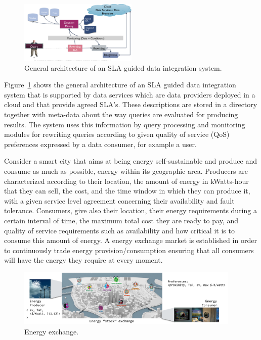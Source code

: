 \begin{figure}
\includegraphics[width=0.5\textwidth]{figs/arch.png}
\caption{General architecture of an SLA guided  data integration system.\label{fig:arch}}
\end{figure}

Figure~\ref{fig:arch} shows the general architecture of an SLA guided data integration system that is supported by data services which are data providers deployed in a cloud and that provide agreed SLA’s. 
These descriptions are stored in a directory together with meta-data about the way queries are evaluated for producing results. 
The system uses this information  by query processing and monitoring modules for rewriting queries according to given quality of service (QoS) preferences expressed by a data consumer, for example a user.


Consider a smart city that aims at being energy self-sustainable and produce and consume as much as possible, energy within its geographic area. 
Producers are characterized according to their location, the amount of energy in kWatts-hour that they can sell, the cost, and the time window in which they can produce it, with a given service level agreement concerning their availability and fault tolerance. 
Consumers, give also their location, their energy requirements during a certain interval of time, the maximum total cost they are ready to pay, and quality of service requirements such as availability and how critical it is to consume this amount of energy. 
A energy exchange market is established in order to continuously trade  energy provision/consumption ensuring that all consumers will have the energy they require at every moment.

\begin{figure}
\includegraphics[width=0.95\textwidth]{figs/exchange.pdf}
\caption{\label{fig:energyXChange} Energy exchange.}
\end{figure}

